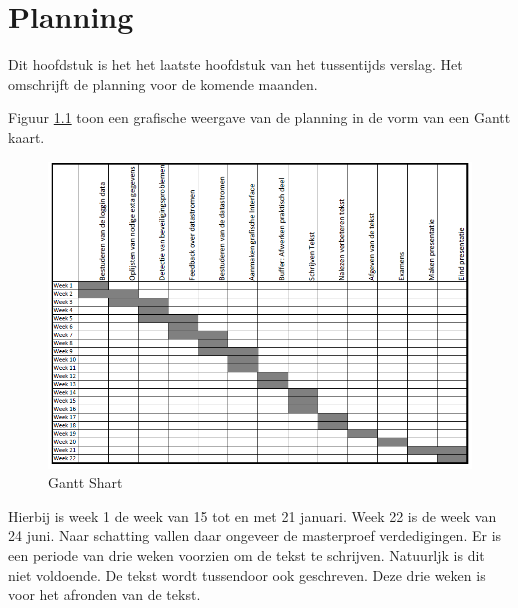 \chapter{Planning}
\label{Planning}
Dit hoofdstuk is het het laatste hoofdstuk van het tussentijds verslag. Het omschrijft de planning voor de komende maanden. 

Figuur \ref{imgGant} toon een grafische weergave van de planning in de vorm van een Gantt kaart. 

\begin{figure}[hpb]
	\includegraphics[scale=0.95]{Gantt.png}
	\caption{Gantt Shart}
	\label{imgGant}
\end{figure} 

Hierbij is week 1 de week van 15 tot en met 21 januari. Week 22 is de week van 24 juni. Naar schatting vallen daar ongeveer de masterproef verdedigingen. 
Er is een periode van drie weken voorzien om de tekst te schrijven. Natuurljk is dit niet voldoende. De tekst wordt tussendoor ook geschreven. Deze drie weken is voor het afronden van de tekst. 
